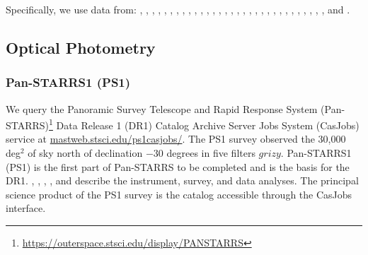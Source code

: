 \documentclass[usenatbib]{mnras}
\begin{document}
Specifically, we use data from: \citet{Fan2000}, \citet{Fan2001c},
\citet{Fan2003} , \citet{Fan2004}, \citet{Mahabal2005},
\citet{Cool2006}, \citet{Fan2006}, \citet{Goto2006},
\citet{McGreer2006}, \citet{Carilli2007}, \citet{Kurk2007},
\citet{Stern2007}, \citet{Venemans2007}, \citet{Willott2007},
\citet{Jiang2008}, \citet{Wang2008} \citet{Jiang2009} \citet{Kurk2009}
\citet{Mortlock2009} \citet{Willott2009} \citet{Carilli2010}
\citet{Wang2010} \citet{Willott2010a} \citet{Willott2010b}
\citet{DeRosa2011} \citet{Mortlock2011} \citet{Wang2011}
\citet{Zeimann2011} \citet{Morganson2012} \citet{Venemans2012}
\citet{McGreer2013} \citet{Venemans2013} \citet{Wang2013}
\citet{Willott2013b} \citet{Banados2014} \citet{Calura2014}
\citet{Leipski2014} \citet{Banados2015a} \citet{Banados2015b}
\citet{Becker2015} \citet{Carnall2015} \citet{Jiang2015}
\citet{Kashikawa2015} \citet{Kim2015} \citet{Reed2015}
\citet{Venemans2015a} \citet{Venemans2015b} \citet{Willott2015}
\citet{Wu2015} \citet{Venemans2016} \citet{Wang2016_WISE}
\citet{Matsuoka2016} \citet{WangR2016} , \citet{Mortlock2011},
\citet{McGreer2013}, \citet{Venemans2013}, \citet{Venemans2013},
\citet{Venemans2015a}, \citet{Venemans2015b}, \citet{Banados2016},
\citet{Matsuoka2016}, \citet{Reed2017}, \citet{Wang2017},
\citet{Mazzucchelli2017}, \citet{Ikeda2017}, \citet{Tang2017},
\citet{Koptelova2017}, \citet{Banados2018}, \citet{Matsuoka2018a}
and \citet{Matsuoka2018b}. 
        
\subsection{Optical Photometry}
\subsubsection{Pan-STARRS1 (PS1)} 
We query the Panoramic Survey Telescope and Rapid Response System
(Pan-STARRS)\footnote{\href{https://outerspace.stsci.edu/display/PANSTARRS}{https://outerspace.stsci.edu/display/PANSTARRS}}
Data Release 1 (DR1) Catalog Archive Server Jobs System (CasJobs)
service at
\href{http://mastweb.stsci.edu/ps1casjobs/}{mastweb.stsci.edu/ps1casjobs/}.
The PS1 survey observed the 30,000 deg$^{2}$ of sky north of
declination $-30$ degrees in five filters $grizy$.  Pan-STARRS1 (PS1)
is the first part of Pan-STARRS to be completed and is the basis for
the DR1.  \citet{Chambers2016}, \citet{Magnier2016a},
\citet{Waters2016}, \citet{Magnier2016b}, \citet{Magnier2016c} and
\citet{Flewelling2016} describe the instrument, survey, and data
analyses.  The principal science product of the PS1 survey is the
catalog accessible through the CasJobs interface.
\end{document}

